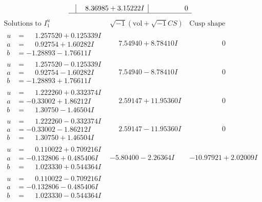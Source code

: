 \documentclass[1p]{elsarticle_modified}
\theoremstyle{definition}
\newcommand{\I}{\sqrt{-1}}
\begin{document}
$$\begin{array}{c|c|c}
 & \phantom{-}8.36985 + 3.15222 I & \phantom{-0.000000 } 0\\
 \hline 
 \end{array}$$\newpage$$\begin{array}{c|c|c}  
\text{Solutions to }I^u_{1}& \I (\text{vol} + \sqrt{-1}CS) & \text{Cusp shape}\\
 \hline 
\begin{aligned}
u &= \phantom{-}1.257520 + 0.125339 I \\
a &= \phantom{-}0.92754 + 1.60282 I \\
b &= -1.28893 - 1.76611 I\end{aligned}
 & \phantom{-}7.54940 + 8.78410 I & \phantom{-0.000000 } 0 \\ \hline\begin{aligned}
u &= \phantom{-}1.257520 - 0.125339 I \\
a &= \phantom{-}0.92754 - 1.60282 I \\
b &= -1.28893 + 1.76611 I\end{aligned}
 & \phantom{-}7.54940 - 8.78410 I & \phantom{-0.000000 } 0 \\ \hline\begin{aligned}
u &= \phantom{-}1.222260 + 0.332374 I \\
a &= -0.33002 + 1.86212 I \\
b &= \phantom{-}1.30750 - 1.46504 I\end{aligned}
 & \phantom{-}2.59147 + 11.95360 I & \phantom{-0.000000 } 0 \\ \hline\begin{aligned}
u &= \phantom{-}1.222260 - 0.332374 I \\
a &= -0.33002 - 1.86212 I \\
b &= \phantom{-}1.30750 + 1.46504 I\end{aligned}
 & \phantom{-}2.59147 - 11.95360 I & \phantom{-0.000000 } 0 \\ \hline\begin{aligned}
u &= \phantom{-}0.110022 + 0.709216 I \\
a &= -0.132806 + 0.485406 I \\
b &= \phantom{-}1.023330 + 0.544364 I\end{aligned}
 & -5.80400 - 2.26364 I & -10.97921 + 2.02009 I \\ \hline\begin{aligned}
u &= \phantom{-}0.110022 - 0.709216 I \\
a &= -0.132806 - 0.485406 I \\
b &= \phantom{-}1.023330 - 0.544364 I\end{aligned}

\end{array}$$
\end{document}
